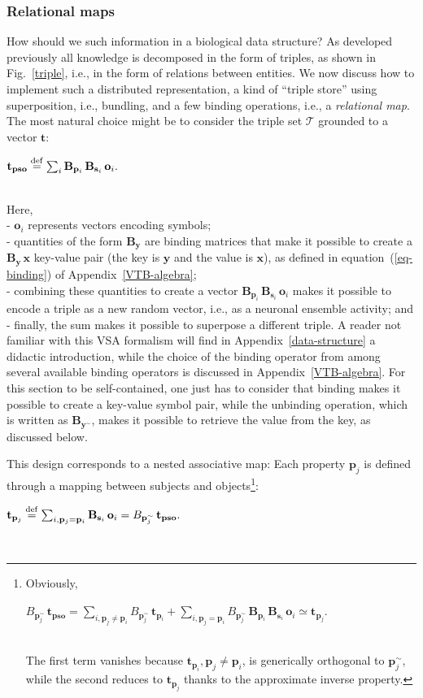 \documentclass[sn-mathphys]{sn-jnl}
\newcommand{\defq}{\stackrel {\rm def}{=}}
\newcommand{\eqline}[1]{~\vspace{0.1cm}\\\centerline{$#1$}\vspace{0.1cm}\\}
\begin{document}
\subsubsection{Relational maps} \label{relational-map}

How should we such information in a biological data structure? As developed previously all knowledge is decomposed in the form of triples, as shown in Fig.~\ref{triple}, i.e., in the form of relations between entities. We now discuss how to implement such a distributed representation, a kind of ``triple store'' using superposition, i.e., bundling, and a few binding operations, i.e., a {\em relational map}. The most natural choice might be to consider the triple set $\mathcal{T}$ grounded to a vector $\mathbf{t}$:
\eqline{\mathbf{t}_{\mathbf{pso}} \defq \sum_i \mathbf{B}_{\mathbf{p}_i} \, \mathbf{B}_{\mathbf{s}_i} \, \mathbf{o}_i.}
Here,
\\ - $\mathbf{o}_i$ represents vectors encoding symbols;
\\ - quantities of the form $\mathbf{B}_{\mathbf{y}}$ are binding matrices that make it possible to create a $\mathbf{B}_{\mathbf{y}} \, \mathbf{x}$ key-value pair (the key is $\mathbf{y}$ and the value is $\mathbf{x}$), as defined in equation~(\ref{eq-binding}) of Appendix~\ref{VTB-algebra};
\\ - combining these quantities to create a vector $\mathbf{B}_{\mathbf{p}_i} \, \mathbf{B}_{\mathbf{s}_i} \, \mathbf{o}_i$ makes it possible to encode a triple as a new random vector, i.e., as a neuronal ensemble activity; and
\\ - finally, the sum makes it possible to superpose a different triple. A reader not familiar with this VSA formalism will find in Appendix~\ref{data-structure} a didactic introduction, while the choice of the binding operator from among several available binding operators \cite{schlegel_comparison_2020} is discussed in Appendix~\ref{VTB-algebra}. For this section to be self-contained, one just has to consider that binding makes it possible to create a key-value symbol pair, while the unbinding operation, which is written as $\mathbf{B}_{\mathbf{y}^\sim}$, makes it possible to retrieve the value from the key, as discussed below. 

This design corresponds to a nested associative map: Each property $\mathbf{p}_j$ is defined through a mapping between subjects and objects\footnote{
Obviously,
\eqline{B_{\mathbf{p}_j^\sim} \, \mathbf{t}_{\mathbf{pso}} =
  \sum_{i, \mathbf{p}_j \neq \mathbf{p}_i} B_{\mathbf{p}_j^\sim} \, \mathbf{t}_{\mathbf{p}_i} +
  \sum_{i, \mathbf{p}_j = \mathbf{p}_i}  B_{\mathbf{p}_j^\sim} \, \mathbf{B}_{\mathbf{p}_i} \, \mathbf{B}_{\mathbf{s}_i} \, \mathbf{o}_i \simeq \mathbf{t}_{\mathbf{p}_j}.}
The first term vanishes because $\mathbf{t}_{\mathbf{p}_i}, \mathbf{p}_j \neq \mathbf{p}_i$, is generically orthogonal to $\mathbf{p}_j^\sim$, while the second reduces to $\mathbf{t}_{\mathbf{p}_j}$ thanks to the approximate inverse property.}:
\eqline{\mathbf{t}_{\mathbf{p}_j} \defq \sum_{i, \mathbf{p}_j = \mathbf{p}_i} \mathbf{B}_{\mathbf{s}_i} \, \mathbf{o}_i = B_{\mathbf{p}_j^\sim} \, \mathbf{t}_{\mathbf{pso}}.}
\end{document}

